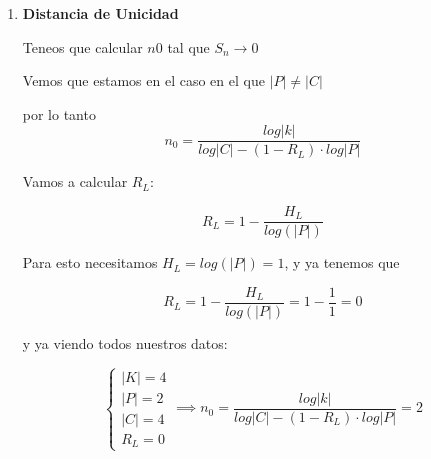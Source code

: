 \begin{example}
\begin{enumerate}
		
		\item \textbf{Distancia de Unicidad}
		
		Teneos que calcular $n0$ tal que $S_n \rightarrow 0$
		
		Vemos que estamos en el caso en el que $|P| \neq |C|$
		
		por lo tanto 
		$$n_0 = \frac{log|k|}{log|C| -(1-R_L)\cdot log|P|}$$
		
		Vamos a calcular $R_L$:
		
		$$R_L= 1 -\frac{H_L}{log(|P|)}$$
		
		Para esto necesitamos $H_L = log(|P|) = 1$, y ya tenemos que
		
		$$R_L= 1 -\frac{H_L}{log(|P|)} = 1- \frac{1}{1} = 0$$
		
		y ya viendo todos nuestros datos:
		
		$$\begin{cases}
		|K| = 4\\
		|P| = 2\\
		|C| = 4\\
		R_L = 0
		\end{cases} \implies n_0 = \frac{log|k|}{log|C| -(1-R_L)\cdot log|P|} = 2$$
	\end{enumerate}
\end{example}

